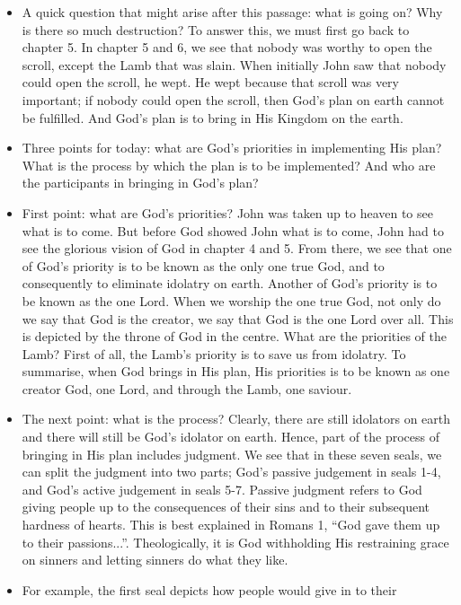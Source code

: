\begin{itemize}
  \item{A quick question that might arise after this passage: what is going
  on?  Why is there so much destruction?  To answer this, we must first go
  back to chapter 5.  In chapter 5 and 6, we see that nobody was worthy to
  open the scroll, except the Lamb that was slain.  When initially John saw
  that nobody could open the scroll, he wept.  He wept because that scroll
  was very important; if nobody could open the scroll, then God's plan on
  earth cannot be fulfilled.  And God's plan is to bring in His Kingdom on
  the earth.  }
  \item{Three points for today: what are God's priorities in implementing His
  plan?  What is the process by which the plan is to be implemented?  And who
  are the participants in bringing in God's plan?}
  \item{First point: what are God's priorities?  John was taken up to heaven
  to see what is to come.  But before God showed John what is to come, John
  had to see the glorious vision of God in chapter 4 and 5.  From there, we
  see that one of God's priority is to be known as the only one true God, and
  to consequently to eliminate idolatry on earth.  Another of God's priority
  is to be known as the one Lord.  When we worship the one true God, not only
  do we say that God is the creator, we say that God is the one Lord over
  all.  This is depicted by the throne of God in the centre.  What are the
  priorities of the Lamb?  First of all, the Lamb's priority is to save us
  from idolatry.  To summarise, when God brings in His plan, His priorities
  is to be known as one creator God, one Lord, and through the Lamb, one
  saviour.}
  \item{The next point: what is the process?  Clearly, there are still
  idolators on earth and there will still be God's idolator on earth.  Hence,
  part of the process of bringing in His plan includes judgment.  We see that
  in these seven seals, we can split the judgment into two parts; God's
  passive judgement in seals 1-4, and God's active judgement in seals 5-7.
  Passive judgment refers to God giving people up to the consequences of
  their sins and to their subsequent hardness of hearts.  This is best
  explained in Romans 1, ``God gave them up to their passions...''.
  Theologically, it is God withholding His restraining grace on sinners and
  letting sinners do what they like.  }
  \item{For example, the first seal depicts how people would give in to their
}
\end{itemize}
